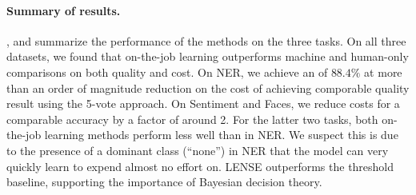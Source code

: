 %
%

\paragraph{Summary of results.}
,  and  summarize the performance of the methods on the three tasks.
On all three datasets, we found that on-the-job learning outperforms machine and human-only comparisons on both quality and cost. 
On NER, we achieve an \fone{} of $88.4\%$ at more than an order of magnitude
reduction on the cost of achieving comporable quality result using the 5-vote
approach. On Sentiment and Faces, we reduce costs for a comparable accuracy by
a factor of around 2.
For the latter two tasks, both on-the-job learning methods perform less well
than in NER.\@
We suspect this is due to the presence of a dominant class
(``none'') in NER that the model can very quickly learn to expend almost no
effort on.  LENSE outperforms the threshold baseline, supporting the importance
of Bayesian decision theory.

